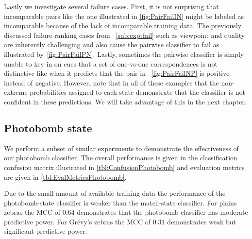         Lastly we investigate several failure cases.
        First, it is not surprising that incomparable pairs like the one illustrated in \cref{fig:PairFailIN}
          might be labeled as incomparable because of the lack of incomparable training data.
        The previously discussed failure ranking cases from ~\cref{sub:exptfail} such as viewpoint and quality
          are inherently challenging and also cause the pairwise classifier to fail as illustrated
          by~\cref{fig:PairFailPN}.
        Lastly, sometimes the pairwise classifier is simply unable to key in on cues that a set of one-vs-one
          correspondences is not distinctive like when it predicts that the pair in ~\cref{fig:PairFailNP} is
          positive instead of negative.
        However, note that in all of these examples that the non-extreme probabilities assigned to each state
          demonstrate that the classifier is not confident in these predictions.
        We will take advantage of this in the next chapter.
        

        \PairFailIN{} 

        \PairFailPN{}

        \PairFailNP{}

        \FloatBarrier{}


    \FloatBarrier{}
    \subsection{Photobomb state}
        We perform a subset of similar experiments to demonstrate the effectiveness of our photobomb classifier.
        The overall performance is given in the classification confusion matrix illustrated in
          \cref{tbl:ConfusionPhotobomb} and evaluation metrics are given in \cref{tbl:EvalMetricsPhotobomb}.

        Due to the small amount of available training data the performance of the photobomb-state classifier is
          weaker than the match-state classifier.
        For plains zebras the MCC of $0.64$ demonstrates that the photobomb classifier has moderate predictive
          power.
        For Grévy's zebras the MCC of $0.31$ demonstrates weak but significant predictive power.

